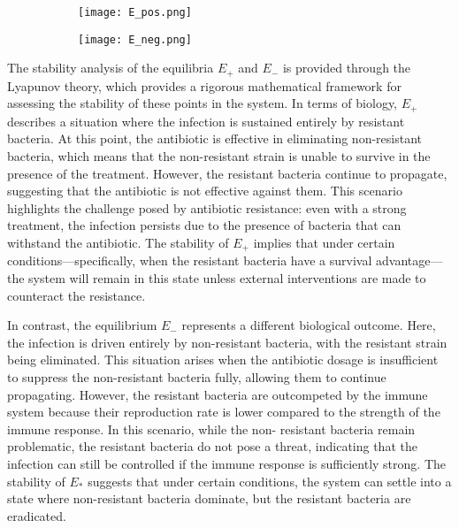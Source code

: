 \begin{figure}
	\centering
	\caption{Equilibria of $E_+$ and $E_-$}
	\begin{subfigure}{0.45\textwidth}
		\texttt{[image: E\_pos.png]}
		\label{fig:epos}
	\end{subfigure}
	\begin{subfigure}{0.45\textwidth}
		\label{fig:eneg}
		\texttt{[image: E\_neg.png]}
	\end{subfigure}
\end{figure}

The stability analysis of the equilibria $E_+$ and $E_-$ is provided through the Lyapunov theory, which provides a rigorous mathematical framework for assessing the stability of these points in the system. In terms of biology, $E_+$ describes a situation where the infection is sustained entirely by resistant bacteria. At this point, the antibiotic is effective in eliminating non-resistant bacteria, which means that the non-resistant strain is unable to survive in the presence of the treatment. However, the resistant bacteria continue to propagate, suggesting that the antibiotic is not effective against them. This scenario highlights the challenge posed by antibiotic resistance: even with a strong treatment, the infection persists due to the presence of bacteria that can withstand the antibiotic. The stability of $E_+$ implies that under certain conditions—specifically, when the resistant bacteria have a survival advantage—the system will remain in this state unless external interventions are made to counteract the resistance.


In contrast, the equilibrium $E_-$ represents a different biological outcome. Here, the infection is driven entirely by non-resistant bacteria, with the resistant strain being eliminated. This situation arises when the antibiotic dosage is insufficient to suppress the non-resistant bacteria fully, allowing them to continue propagating. However, the resistant bacteria are outcompeted by the immune system because their reproduction rate is lower compared to the strength of the immune response. In this scenario, while the non- resistant bacteria remain problematic, the resistant bacteria do not pose a threat, indicating that the infection can still be controlled if the immune response is sufficiently strong. The stability of $E_*$ suggests that under certain conditions, the system can settle into a state where non-resistant bacteria dominate, but the resistant bacteria are eradicated.

